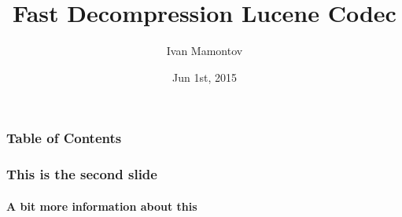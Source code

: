 \documentclass{beamer}
\title{Fast Decompression Lucene Codec}
\author{Ivan Mamontov}
\date{Jun 1st, 2015}
\begin{document}
	\begin{frame}
		\titlepage
	\end{frame}
  	\begin{frame}
		\frametitle{Table of Contents}
		\tableofcontents[currentsection]
  	\end{frame}
  	\begin{frame}
    		\frametitle{This is the second slide}
    		\framesubtitle{A bit more information about this}
  	\end{frame}
\end{document}

